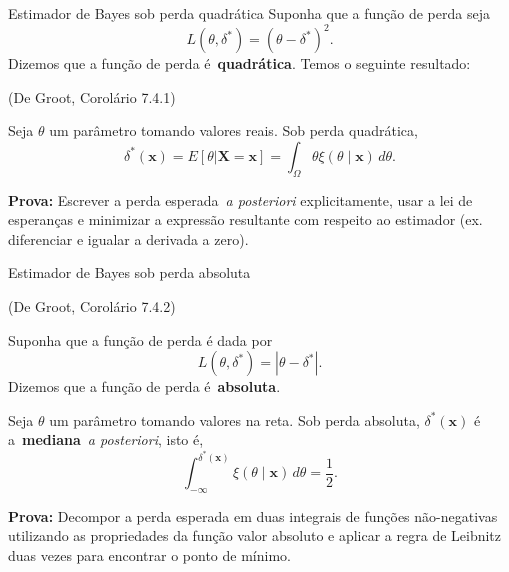 \begin{frame}{Estimador de Bayes sob perda quadrática}
Suponha que a função de perda seja 
\[ L(\theta, \delta^\ast) =  (\theta-\delta^\ast)^2. \]
Dizemos que a função de perda é~\textbf{quadrática}.
Temos o seguinte resultado:
 \begin{theo}
  \label{thm:posterior_mean_quadratic}
  (De Groot, Corolário 7.4.1)
  
  Seja $\theta$ um parâmetro tomando valores reais.
  Sob perda quadrática,
  $$\delta^\ast(\boldsymbol{x}) = E[\theta | \boldsymbol{X} = \boldsymbol{x}] = \int_{\Omega} \theta \xi(\theta \mid \boldsymbol{x} ) \,d\theta.$$
 \end{theo}
 \textbf{Prova:} Escrever a perda esperada~\textit{a posteriori} explicitamente, usar a lei de esperanças e minimizar a expressão resultante com respeito ao estimador (ex. diferenciar e igualar a derivada a zero).
\end{frame}

\begin{frame}{Estimador de Bayes sob perda absoluta}
 \begin{theo}
  \label{thm:posterior_median_absolute}
  (De Groot, Corolário 7.4.2)
  
  Suponha que a função de perda é dada por  
\[ L(\theta, \delta^\ast) =  |\theta-\delta^\ast|. \]
Dizemos que a função de perda é~\textbf{absoluta}.
  
  Seja $\theta$ um parâmetro tomando valores na reta.
  Sob perda absoluta, $\delta^\ast(\boldsymbol{x})$ é a~\textbf{mediana}~\textit{a posteriori}, isto é,
  $$\int_{-\infty}^{\delta^\ast(\boldsymbol{x})}\xi(\theta \mid \boldsymbol{x} ) \,d\theta = \frac{1}{2}.$$
 \end{theo}
 \textbf{Prova:} Decompor a perda esperada em duas integrais de funções não-negativas utilizando as propriedades da função valor absoluto e aplicar a regra de Leibnitz duas vezes para encontrar o ponto de mínimo.
\end{frame}


